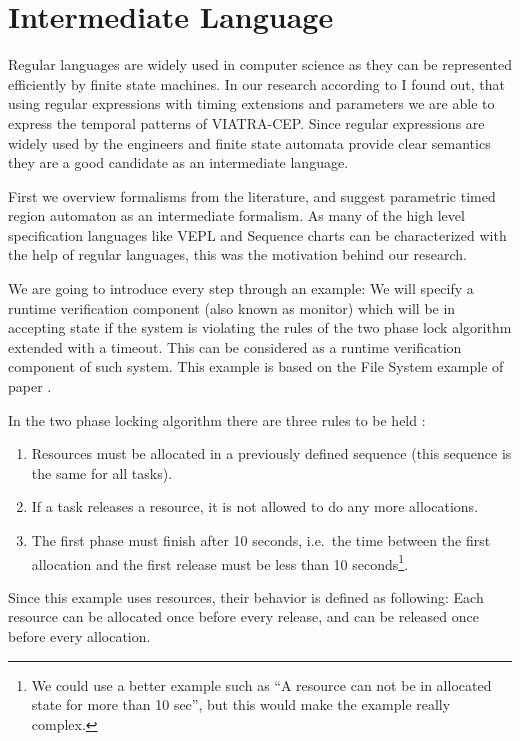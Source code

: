 	\chapter{Intermediate Language}
	\label{chap:cep}
	
	Regular languages are widely used in computer science as they can be represented efficiently by finite state machines.		
	In our research according to \citep{davidi} I found out, that using regular expressions with timing extensions and parameters we are able to express the temporal patterns of VIATRA-CEP.
	Since regular expressions are widely used by the engineers and finite state automata provide clear semantics they are a good candidate as an intermediate language.
	
	First we overview formalisms from the literature, and suggest parametric timed region automaton as an intermediate formalism.
	As many of the high level specification languages like VEPL and Sequence charts can be characterized with the help of regular languages,
	this was the motivation behind our research.%
	
	We are going to introduce every step through an example: 
	We will specify a runtime verification component (also known as monitor) which will be in accepting state if the system is violating the rules of the two phase lock algorithm extended with a timeout.
	This can be considered as a runtime verification component of such system. This example is based on the File System example of paper \citep{marq}.
	
	In the two phase locking algorithm there are three rules to be held :
	\begin{enumerate}
		\item Resources must be allocated in a previously defined sequence (this sequence is the same for all tasks).
		\item If a task releases a resource, it is not allowed to do any more allocations.
		\item The first phase must finish after 10 seconds, i.e.~the time between the first allocation and the first release must be less than 10 seconds\footnote{We could use a better example such as ``A resource can not be in allocated state for more than 10 sec'', but this would make the example really complex.}. 
	\end{enumerate}
	
	Since this example uses resources, their behavior is defined as following:
	Each resource can be allocated once before every release, and can be released once before every allocation.
		
